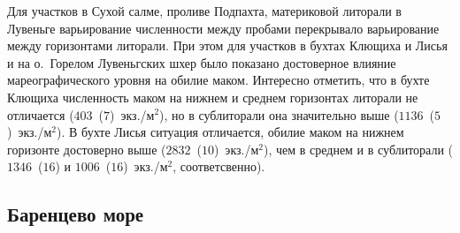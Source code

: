 %
Для участков в Сухой салме, проливе Подпахта, материковой литорали в Лувеньге варьирование численности между пробами перекрывало варьирование между горизонтами литорали.
При этом для участков в бухтах Клющиха и Лисья и на о.~Горелом Лувеньгских шхер  было показано достоверное влияние мареографического уровня на обилие маком. 
Интересно отметить, что в бухте Клющиха численность маком на нижнем и среднем горизонтах литорали не отличается ($403$~($7$)~экз./м$^2$), но в сублиторали она значительно выше ($1136$~($5$)~экз./м$^2$).
В бухте Лисья ситуация отличается, обилие маком на нижнем горизонте достоверно выше ($2832$~($10$)~экз./м$^2$), чем в среднем и в сублиторали ($1346$~($16$) и $1006$~($16$)~экз./м$^2$, соответсвенно). 



	\subsection{Баренцево море}

